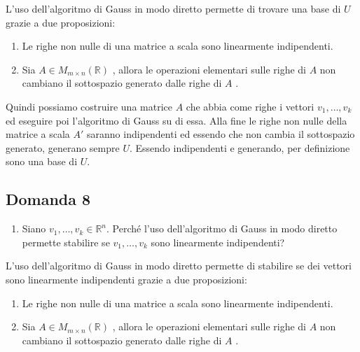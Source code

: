 \documentclass[
  a4paper,
]{article}
\providecommand{\tightlist}{%
  \setlength{\itemsep}{0pt}\setlength{\parskip}{0pt}}
\providecommand{\tightlist}{}
\begin{document}
L'uso dell'algoritmo di Gauss in modo diretto permette di trovare una
base di \(U\) grazie a due proposizioni:

\begin{enumerate}
\def\labelenumi{\arabic{enumi}.}
\tightlist
\item
  Le righe non nulle di una matrice a scala sono linearmente
  indipendenti.
\item
  Sia \(A \in M_{m \times n}(\mathbb{R})\) , allora le operazioni
  elementari sulle righe di \(A\) non cambiano il sottospazio generato
  dalle righe di \(A\) .
\end{enumerate}

Quindi possiamo costruire una matrice \(A\) che abbia come righe i
vettori \(v_1,\ldots,v_k\) ed eseguire poi l'algoritmo di Gauss su di
essa. Alla fine le righe non nulle della matrice a scala \(A'\) saranno
indipendenti ed essendo che non cambia il sottospazio generato, generano
sempre \(U\). Essendo indipendenti e generando, per definizione sono una
base di \(U\).

\hypertarget{domanda-8}{%
\subsection{Domanda 8}\label{domanda-8}}

\begin{observationbox}[Domanda]
\begin{enumerate}
\def\labelenumi{\arabic{enumi}.}
\setcounter{enumi}{7}
\tightlist
\item
  Siano \(v_1,\ldots,v_k\in \mathbb{R}^n\). Perché l'uso dell'algoritmo
  di Gauss in modo diretto permette stabilire se \(v_1,\ldots,v_k\) sono
  linearmente indipendenti?
\end{enumerate}
\end{observationbox}

L'uso dell'algoritmo di Gauss in modo diretto permette di stabilire se
dei vettori sono linearmente indipendenti grazie a due proposizioni:

\begin{enumerate}
\def\labelenumi{\arabic{enumi}.}
\tightlist
\item
  Le righe non nulle di una matrice a scala sono linearmente
  indipendenti.
\item
  Sia \(A \in M_{m \times n}(\mathbb{R})\) , allora le operazioni
  elementari sulle righe di \(A\) non cambiano il sottospazio generato
  dalle righe di \(A\) .
\end{enumerate}
\end{document}
